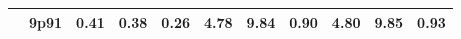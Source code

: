 \documentclass[12pt,A4paper]{article}
\begin{document}
\begin{table}[]
\begin{tabular}{lllllllllll}
\multicolumn{1}{|l|}{} & \multicolumn{1}{l|}{9p91} & \multicolumn{1}{c|}{0.41}        & \multicolumn{1}{c|}{0.38}         & \multicolumn{1}{c|}{0.26}        & \multicolumn{1}{c|}{4.78}         & \multicolumn{1}{c|}{9.84}        & \multicolumn{1}{c|}{0.90}        & \multicolumn{1}{c|}{4.80}        & \multicolumn{1}{c|}{9.85}        & \multicolumn{1}{c|}{0.93}         \\ \hline

\end{tabular}
\end{table}
\end{document}
